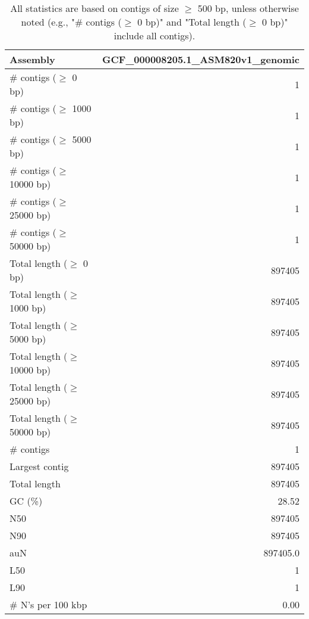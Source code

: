 \documentclass[12pt,a4paper]{article}
\begin{document}
\begin{table}[ht]
\begin{center}
\caption{All statistics are based on contigs of size $\geq$ 500 bp, unless otherwise noted (e.g., "\# contigs ($\geq$ 0 bp)" and "Total length ($\geq$ 0 bp)" include all contigs).}
\begin{tabular}{|l*{1}{|r}|}
\hline
Assembly & GCF\_000008205.1\_ASM820v1\_genomic \\ \hline
\# contigs ($\geq$ 0 bp) & 1 \\ \hline
\# contigs ($\geq$ 1000 bp) & 1 \\ \hline
\# contigs ($\geq$ 5000 bp) & 1 \\ \hline
\# contigs ($\geq$ 10000 bp) & 1 \\ \hline
\# contigs ($\geq$ 25000 bp) & 1 \\ \hline
\# contigs ($\geq$ 50000 bp) & 1 \\ \hline
Total length ($\geq$ 0 bp) & 897405 \\ \hline
Total length ($\geq$ 1000 bp) & 897405 \\ \hline
Total length ($\geq$ 5000 bp) & 897405 \\ \hline
Total length ($\geq$ 10000 bp) & 897405 \\ \hline
Total length ($\geq$ 25000 bp) & 897405 \\ \hline
Total length ($\geq$ 50000 bp) & 897405 \\ \hline
\# contigs & 1 \\ \hline
Largest contig & 897405 \\ \hline
Total length & 897405 \\ \hline
GC (\%) & 28.52 \\ \hline
N50 & 897405 \\ \hline
N90 & 897405 \\ \hline
auN & 897405.0 \\ \hline
L50 & 1 \\ \hline
L90 & 1 \\ \hline
\# N's per 100 kbp & 0.00 \\ \hline
\end{tabular}
\end{center}
\end{table}
\end{document}
